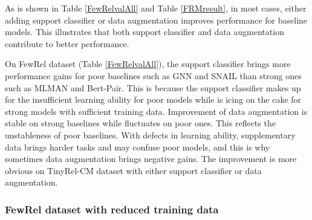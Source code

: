 As is shown in Table \ref{FewRelvalAll} and Table \ref{FRMresult}, in most cases, either adding support classifier or data augmentation improves performance for baseline models.
This illustrates that both support classifier and data augmentation contribute to better performance.

On FewRel dataset (Table \ref{FewRelvalAll}), the support classifier brings more performance gains for poor baselines such as GNN and SNAIL than strong ones such as MLMAN and Bert-Pair. This is because the support classifier makes up for the insufficient learning ability for poor models while is icing on the cake for strong models with sufficient training data.
Improvement of data augmentation is stable on strong baselines while fluctuates on poor ones. This reflects the unstableness of poor baselines. With defects in learning ability, supplementary data brings harder tasks and may confuse poor models, and this is why sometimes data augmentation brings negative gains.
The improvement is more obvious on TinyRel-CM dataset with either support classifier or data augmentation.

\subsubsection{FewRel dataset with reduced training data}

